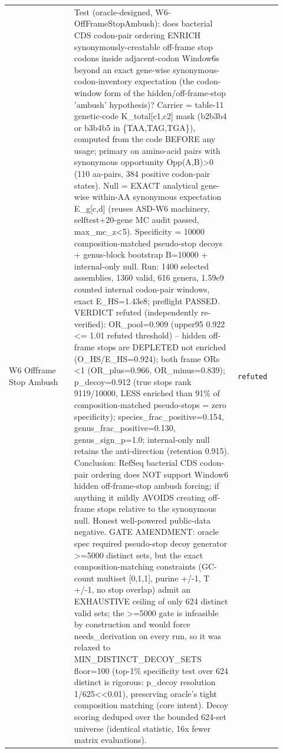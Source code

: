 \begin{longtable}{>{\raggedright\arraybackslash}p{0.22\linewidth}>{\raggedright\arraybackslash}p{0.55\linewidth}>{\raggedright\arraybackslash}p{0.15\linewidth}}
W6 Offframe Stop Ambush & Test (oracle-designed, W6-OffFrameStopAmbush): does bacterial CDS codon-pair ordering ENRICH synonymously-creatable off-frame stop codons inside adjacent-codon Window6s beyond an exact gene-wise synonymous-codon-inventory expectation (the codon-window form of the hidden/off-frame-stop 'ambush' hypothesis)? Carrier = table-11 genetic-code K\_total[c1,c2] mask (b2b3b4 or b3b4b5 in \{TAA,TAG,TGA\}), computed from the code BEFORE any usage; primary on amino-acid pairs with synonymous opportunity Opp(A,B)>0 (110 aa-pairs, 384 positive codon-pair states). Null = EXACT analytical gene-wise within-AA synonymous expectation E\_g[c,d] (reuses ASD-W6 machinery, selftest+20-gene MC audit passed, max\_mc\_z<5). Specificity = 10000 composition-matched pseudo-stop decoys + genus-block bootstrap B=10000 + internal-only null. Run: 1400 selected assemblies, 1360 valid, 616 genera, 1.59e9 counted internal codon-pair windows, exact E\_HS=1.43e8; preflight PASSED. VERDICT refuted (independently re-verified): OR\_pool=0.909 (upper95 0.922 <= 1.01 refuted threshold) -- hidden off-frame stops are DEPLETED not enriched (O\_HS/E\_HS=0.924); both frame ORs <1 (OR\_plus=0.966, OR\_minus=0.839); p\_decoy=0.912 (true stops rank 9119/10000, LESS enriched than 91\% of composition-matched pseudo-stops = zero specificity); species\_frac\_positive=0.154, genus\_frac\_positive=0.130, genus\_sign\_p=1.0; internal-only null retains the anti-direction (retention 0.915). Conclusion: RefSeq bacterial CDS codon-pair ordering does NOT support Window6 hidden off-frame-stop ambush forcing; if anything it mildly AVOIDS creating off-frame stops relative to the synonymous null. Honest well-powered public-data negative. GATE AMENDMENT: oracle spec required pseudo-stop decoy generator >=5000 distinct sets, but the exact composition-matching constraints (GC-count multiset [0,1,1], purine +/-1, T +/-1, no stop overlap) admit an EXHAUSTIVE ceiling of only 624 distinct valid sets; the >=5000 gate is infeasible by construction and would force needs\_derivation on every run, so it was relaxed to MIN\_DISTINCT\_DECOY\_SETS floor=100 (top-1\% specificity test over 624 distinct is rigorous: p\_decoy resolution 1/625<<0.01), preserving oracle's tight composition matching (core intent). Decoy scoring deduped over the bounded 624-set universe (identical statistic, 16x fewer matrix evaluations). & \texttt{refuted} \\

\end{longtable}
